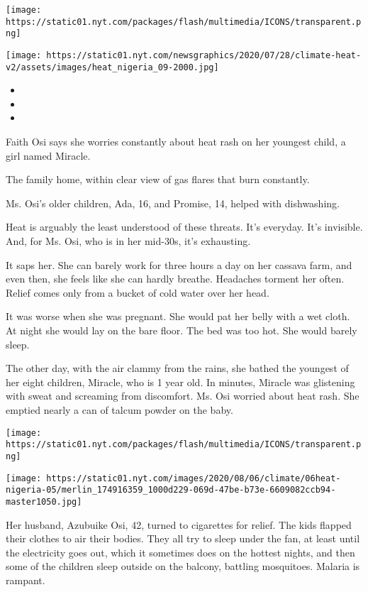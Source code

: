 \texttt{[image: https://static01.nyt.com/packages/flash/multimedia/ICONS/transparent.png]}

\texttt{[image: https://static01.nyt.com/newsgraphics/2020/07/28/climate-heat-v2/assets/images/heat\_nigeria\_09-2000.jpg]}

\begin{itemize}
\item
\item
\item
\end{itemize}

Faith Osi says she worries constantly about heat rash on her youngest
child, a girl named Miracle.

The family home, within clear view of gas flares that burn constantly.

Ms. Osi's older children, Ada, 16, and Promise, 14, helped with
dishwashing.

Heat is arguably the least understood of these threats. It's everyday.
It's invisible. And, for Ms. Osi, who is in her mid-30s, it's
exhausting.

It saps her. She can barely work for three hours a day on her cassava
farm, and even then, she feels like she can hardly breathe. Headaches
torment her often. Relief comes only from a bucket of cold water over
her head.

It was worse when she was pregnant. She would pat her belly with a wet
cloth. At night she would lay on the bare floor. The bed was too hot.
She would barely sleep.

The other day, with the air clammy from the rains, she bathed the
youngest of her eight children, Miracle, who is 1 year old. In minutes,
Miracle was glistening with sweat and screaming from discomfort. Ms. Osi
worried about heat rash. She emptied nearly a can of talcum powder on
the baby.

\texttt{[image: https://static01.nyt.com/packages/flash/multimedia/ICONS/transparent.png]}

\texttt{[image: https://static01.nyt.com/images/2020/08/06/climate/06heat-nigeria-05/merlin\_174916359\_1000d229-069d-47be-b73e-6609082ccb94-master1050.jpg]}

Her husband, Azubuike Osi, 42, turned to cigarettes for relief. The kids
flapped their clothes to air their bodies. They all try to sleep under
the fan, at least until the electricity goes out, which it sometimes
does on the hottest nights, and then some of the children sleep outside
on the balcony, battling mosquitoes. Malaria is rampant.

